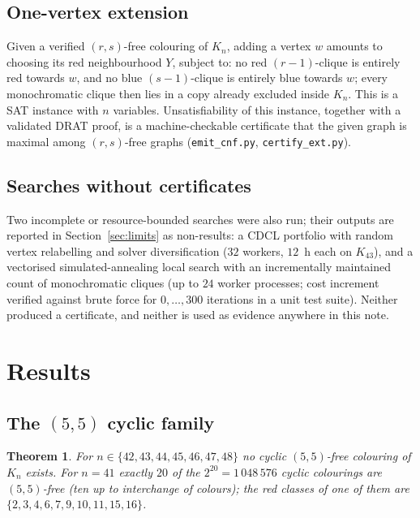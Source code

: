 \documentclass[11pt]{article}
\newtheorem{theorem}{Theorem}
\theoremstyle{definition}
\theoremstyle{plain}
\newcommand{\K}{\ensuremath{K}}
\begin{document}
\subsection{One-vertex extension}\label{sec:ext}
Given a verified $(r,s)$-free colouring of $\K_n$, adding a vertex $w$ amounts
to choosing its red neighbourhood $Y$, subject to: no red $(r-1)$-clique is
entirely red towards $w$, and no blue $(s-1)$-clique is entirely blue towards
$w$; every monochromatic clique then lies in a copy already excluded inside
$\K_n$. This is a SAT instance with $n$ variables. Unsatisfiability of this
instance, together with a validated DRAT proof, is a machine-checkable
certificate that the given graph is maximal among $(r,s)$-free graphs
(\texttt{emit\_cnf.py}, \texttt{certify\_ext.py}).

\subsection{Searches without certificates}\label{sec:noncerts}
Two incomplete or resource-bounded searches were also run; their outputs are
reported in Section~\ref{sec:limits} as non-results: a CDCL portfolio with
random vertex relabelling and solver diversification ($32$ workers, $12$~h
each on $\K_{43}$), and a vectorised simulated-annealing local search with an
incrementally maintained count of monochromatic cliques (up to $24$ worker
processes; cost increment verified against brute force for
$0,\dots,300$ iterations in a unit test suite). Neither produced a certificate,
and neither is used as evidence anywhere in this note.

\section{Results}\label{sec:results}

\subsection{The $(5,5)$ cyclic family}\label{sec:res55}

\begin{theorem}\label{thm:cyclic}
For $n \in \{42,43,44,45,46,47,48\}$ no cyclic $(5,5)$-free colouring of
$\K_n$ exists. For $n = 41$ exactly $20$ of the $2^{20} = 1\,048\,576$ cyclic
colourings are $(5,5)$-free (ten up to interchange of colours); the red classes
of one of them are $\{2,3,4,6,7,9,10,11,15,16\}$.
\end{theorem}
\end{document}
